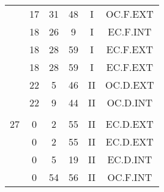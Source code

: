 \documentclass[12pt, a4paper]{article}
\begin{document}
\begin{multicols}{3}
{\begin{tabular}{c c c c c c}
	 	 	 	 & 17 & 31 & 48 & I & OC.F.EXT\\%
	 	 	 	 & 18 & 26 & 9 & I & EC.F.INT\\%
	 	 	 	 & 18 & 28 & 59 & I & EC.F.EXT\\%
	 	 	 	 & 18 & 28 & 59 & I & EC.F.EXT\\%
	 	 	 	 & 22 & 5 & 46 & II & OC.D.EXT\\%
	 	 	 	 & 22 & 9 & 44 & II & OC.D.INT\\%
	 	 	 	 & & & & & \\%
	 	 	 	27 & 0 & 2 & 55 & II & EC.D.EXT\\%
	 	 	 	 & 0 & 2 & 55 & II & EC.D.EXT\\%
	 	 	 	 & 0 & 5 & 19 & II & EC.D.INT\\%
	 	 	 	 & 0 & 54 & 56 & II & OC.F.INT\\%
	 	 \end{tabular}
 	}
\end{multicols}
\end{document}

